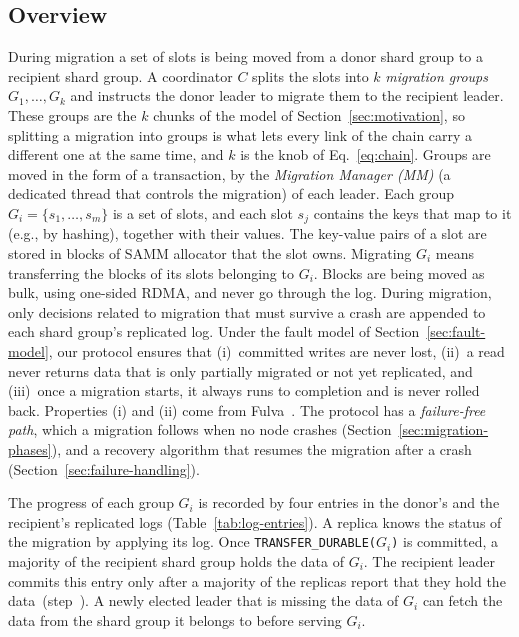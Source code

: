 \subsection{Overview}
\label{sec:migration-protocol}
\label{sec:log-entries}

During migration a set of slots is being moved from a donor shard group to a recipient shard group.
A coordinator $C$ splits the slots into $k$ \emph{migration groups} $G_1, \dots, G_k$ and instructs the donor leader to migrate them to the recipient leader.
These groups are the $k$ chunks of the model of Section~\ref{sec:motivation}, so splitting a migration into groups is what lets every link of the chain carry a different one at the same time, and $k$ is the knob of Eq.~\eqref{eq:chain}.
Groups are moved in the form of a transaction, by the \emph{Migration Manager (MM)} (a dedicated thread that controls the migration) of each leader.
Each group $G_i = \{s_1, \dots, s_m\}$ is a set of slots, and each slot $s_j$ contains the keys that map to it (e.g., by hashing), together with their values.
The key-value pairs of a slot are stored in blocks of SAMM allocator that the slot owns.
Migrating $G_i$ means transferring the blocks of its slots belonging to $G_i$.
Blocks are being moved as bulk, using one-sided RDMA, and never go through the log.
During migration, only decisions related to migration that must survive a crash are appended to each shard group's replicated log.
Under the fault model of Section~\ref{sec:fault-model}, our protocol ensures that
(i)~committed writes are never lost,
(ii)~a read never returns data that is only partially migrated or not yet replicated, and
(iii)~once a migration starts, it always runs to completion and is never rolled back.
Properties (i) and (ii) come from Fulva~\cite{fulva}.
The protocol has a \emph{failure-free path}, which a migration follows when no node crashes (Section~\ref{sec:migration-phases}), and a recovery algorithm that resumes the migration after a crash (Section~\ref{sec:failure-handling}).

The progress of each group $G_i$ is recorded by four entries in the donor's and the recipient's replicated logs (Table~\ref{tab:log-entries}).
A replica knows the status of the migration by applying its log.
Once \texttt{TRANSFER\_DURABLE($G_i$)} is committed, a majority of the recipient shard group holds the data of $G_i$.
The recipient leader commits this entry only after a majority of the replicas report that they hold the data~(step~).
A newly elected leader that is missing the data of $G_i$ can fetch the data from the shard group it belongs to before serving $G_i$.

